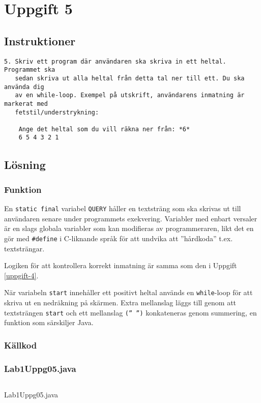 \section{Uppgift 5}\label{uppgift-5}

\subsection{Instruktioner}
\begin{verbatim}
5. Skriv ett program där användaren ska skriva in ett heltal. Programmet ska
   sedan skriva ut alla heltal från detta tal ner till ett. Du ska använda dig
   av en while-loop. Exempel på utskrift, användarens inmatning är markerat med
   fetstil/understrykning:

    Ange det heltal som du vill räkna ner från: *6*
    6 5 4 3 2 1
\end{verbatim}

\subsection{Lösning}
\subsubsection{Funktion}
En \texttt{static final} variabel \texttt{QUERY} håller en textsträng som ska
skrivas ut till användaren senare under programmets exekvering.
Variabler med enbart versaler är en slags globala variabler som kan modifieras
av programmeraren, likt det en gör med \texttt{\#define} i C-liknande språk för
att undvika att ''hårdkoda'' t.ex. textsträngar.
\par Logiken för att kontrollera korrekt inmatning är samma som den i Uppgift
\ref{uppgift-4}.
\par När variabeln \texttt{start} innehåller ett positivt heltal används en
\texttt{while}-loop för att skriva ut en nedräkning på skärmen. Extra mellanslag
läggs till genom att textsträngen \texttt{start} och ett mellanslag 
\texttt{(''\ '')} konkateneras genom summering, en funktion som särskiljer Java.

\subsubsection{Källkod}\label{uppgift-5_src}
\subsubsection*{Lab1Uppg05.java}
    \inputminted[linenos]{java}{src/Lab1Uppg05.java}
    \caption{Lab1Uppg05.java}
    \label{Uppg5src}
